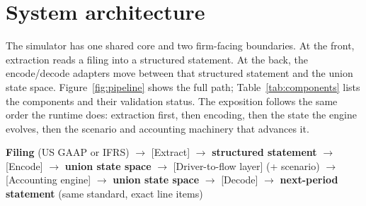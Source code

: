 \documentclass[11pt]{article}
\begin{document}
\section{System architecture}
The simulator has one shared core and two firm-facing boundaries. At the front, extraction reads a filing into a structured statement. At the back, the encode/decode adapters move between that structured statement and the union state space. Figure~\ref{fig:pipeline} shows the full path; Table~\ref{tab:components} lists the components and their validation status. The exposition follows the same order the runtime does: extraction first, then encoding, then the state the engine evolves, then the scenario and accounting machinery that advances it.

\noindent\begin{minipage}{\linewidth}
\begin{tcolorbox}[colback=callfill,colframe=callborder,boxrule=0.5pt,arc=2pt,left=10pt,right=10pt,top=6pt,bottom=6pt]
\centering
{\bfseries Filing} (US GAAP or IFRS) $\rightarrow$ {\color{navytwo}[Extract]} $\rightarrow$ {\bfseries structured statement} $\rightarrow$ {\color{navytwo}[Encode]} $\rightarrow$ {\bfseries union state space} $\rightarrow$ {\color{navytwo}[Driver-to-flow layer]} (+ scenario) $\rightarrow$ {\color{navytwo}[Accounting engine]} $\rightarrow$ {\bfseries union state space} $\rightarrow$ {\color{navytwo}[Decode]} $\rightarrow$ {\bfseries next-period statement} (same standard, exact line items)
\end{tcolorbox}
\end{minipage}
\end{document}
